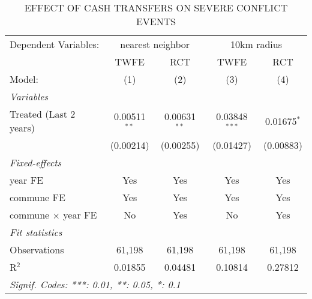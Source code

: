 \begin{table}[htbp]
   \caption{\label{tab:regression_results} EFFECT OF CASH TRANSFERS ON SEVERE CONFLICT EVENTS}
   \centering
   \begin{tabular}{lcccc}
      \tabularnewline \midrule \midrule
      Dependent Variables: & \multicolumn{2}{c}{nearest neighbor} & \multicolumn{2}{c}{10km radius}\\
 & TWFE & RCT & TWFE & RCT\\
      Model:                 & (1)            & (2)            & (3)             & (4)\\  
      \midrule
      \emph{Variables}\\
      Treated (Last 2 years) & 0.00511$^{**}$ & 0.00631$^{**}$ & 0.03848$^{***}$ & 0.01675$^{*}$\\   
                             & (0.00214)      & (0.00255)      & (0.01427)       & (0.00883)\\   
      \midrule
      \emph{Fixed-effects}\\
      year FE                & Yes            & Yes            & Yes             & Yes\\  
      commune FE             & Yes            & Yes            & Yes             & Yes\\  
      commune $\times$ year FE      & No            & Yes            & No            & Yes\\  
      \midrule
      \emph{Fit statistics}\\
      Observations           & 61,198         & 61,198         & 61,198          & 61,198\\  
      R$^2$                  & 0.01855        & 0.04481        & 0.10814         & 0.27812\\  
      \midrule \midrule
      
      \multicolumn{5}{l}{\emph{Signif. Codes: ***: 0.01, **: 0.05, *: 0.1}}\\
   \end{tabular}
\end{table}

